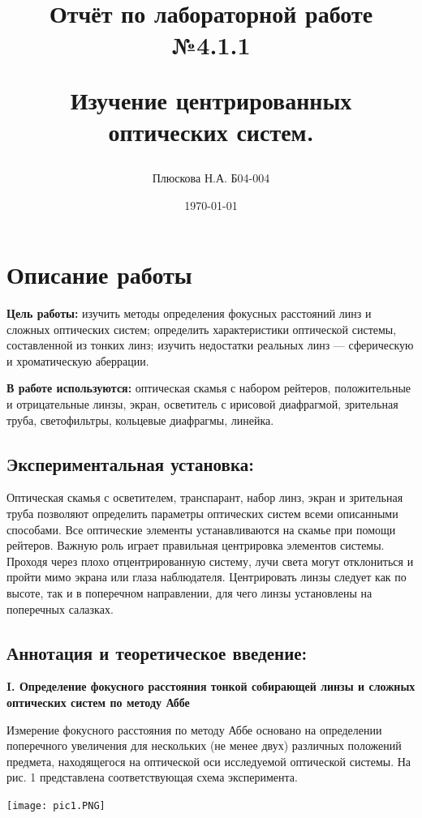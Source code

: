 \documentclass[a4paper,12pt]{report}
\title{Отчёт по лабораторной работе №4.1.1 

Изучение центрированных оптических систем.}
\author{Плюскова Н.А. Б04-004 }
\date{\today}
\begin{document}
\maketitle

\section*{\huge{Описание работы}}
\noindent\textbf{Цель работы:} изучить методы определения фокусных расстояний
линз и сложных оптических систем; определить характеристики оптической системы, составленной из тонких линз; изучить недостатки
реальных линз — сферическую и хроматическую аберрации.

\noindent\textbf{В работе используются:} оптическая скамья с набором рейтеров, положительные и отрицательные линзы, экран, осветитель с ирисовой
диафрагмой, зрительная труба, светофильтры, кольцевые диафрагмы, линейка.

\subsection*{Экспериментальная установка:} 

Оптическая скамья с осветителем,
транспарант, набор линз, экран и зрительная труба позволяют определить параметры оптических систем всеми описанными способами. Все
оптические элементы устанавливаются на скамье при помощи рейтеров.
Важную роль играет правильная центрировка элементов системы.
Проходя через плохо отцентрированную систему, лучи света могут отклониться и пройти мимо экрана или глаза наблюдателя. Центрировать
линзы следует как по высоте, так и в поперечном направлении, для чего
линзы установлены на поперечных салазках.

\subsection*{Аннотация и теоретическое введение:}

\noindent\textbf{I. Определение фокусного расстояния тонкой собирающей линзы
и сложных оптических систем по методу Аббе}

Измерение фокусного расстояния по методу Аббе основано на определении поперечного увеличения для нескольких (не менее двух) различных положений предмета, находящегося на оптической оси исследуемой оптической системы. На рис. 1 представлена соответствующая схема эксперимента.
\begin{center}
    \texttt{[image: pic1.PNG]}
\end{center}
\end{document}

